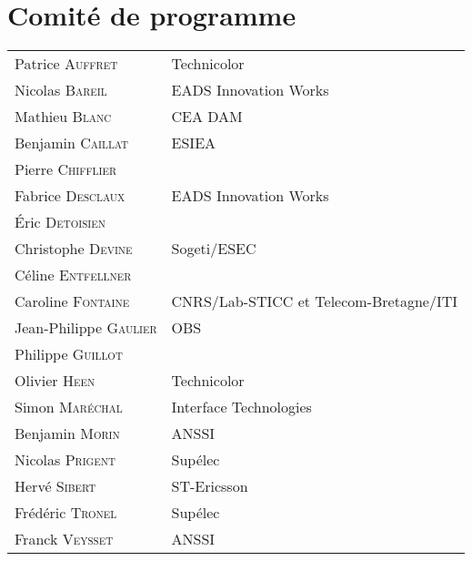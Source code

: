 \begin{minipage}{1.0\linewidth}
  \section*{Comité de programme}
  \begin{tabular}{@{}p{5cm}@{}p{10.2cm}@{}}
    Patrice  \textsc{Auffret}       & Technicolor                           \\
    Nicolas  \textsc{Bareil}        & EADS Innovation Works                 \\
    Mathieu  \textsc{Blanc}         & CEA DAM                               \\
    Benjamin  \textsc{Caillat}      & ESIEA                                 \\
    Pierre  \textsc{Chifflier}      &                                       \\
    Fabrice  \textsc{Desclaux}      & EADS Innovation Works                 \\
    Éric  \textsc{Detoisien}        &                                       \\
    Christophe  \textsc{Devine}     & Sogeti/ESEC                           \\
    Céline  \textsc{Entfellner}     &                                       \\
    Caroline  \textsc{Fontaine}     & CNRS/Lab-STICC et Telecom-Bretagne/ITI\\
    Jean-Philippe  \textsc{Gaulier} & OBS                                   \\
    Philippe  \textsc{Guillot}      &                                       \\
    Olivier  \textsc{Heen}          & Technicolor                           \\
    Simon  \textsc{Maréchal}        & Interface Technologies                \\
    Benjamin  \textsc{Morin}        & ANSSI                                 \\
    Nicolas  \textsc{Prigent}       & Sup\'elec                             \\
    Hervé \textsc{Sibert}           & ST-Ericsson                           \\
    Fr\'ed\'eric  \textsc{Tronel}   & Sup\'elec                             \\
    Franck  \textsc{Veysset}        & ANSSI                                 \\
  \end{tabular}


\end{minipage}
